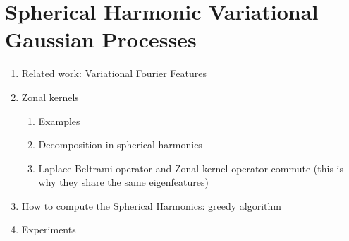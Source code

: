 \chapter{Spherical Harmonic Variational Gaussian Processes}

\begin{enumerate}
    \item Related work: Variational Fourier Features
    \item Zonal kernels
    \begin{enumerate}
        \item Examples
        \item Decomposition in spherical harmonics
        \item Laplace Beltrami operator and Zonal kernel operator commute (this is why they share the same eigenfeatures)
    \end{enumerate}
    \item How to compute the Spherical Harmonics: greedy algorithm
    \item Experiments
\end{enumerate}